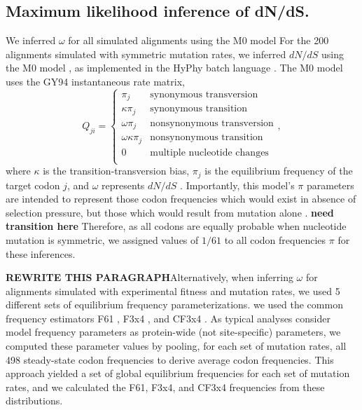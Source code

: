 \documentclass{pnastwo}
\begin{document}
\begin{article}
\subsection*{Maximum likelihood inference of dN/dS.}
We inferred $\omega$ for all simulated alignments using the M0 model 
For the 200 alignments simulated with symmetric mutation rates, we inferred $dN/dS$ using the M0 model \cite{Yangetal2000}, as implemented in the HyPhy batch language \cite{KosakovskyPondetal2005}. The M0 model uses the GY94 instantaneous rate matrix,
\begin{equation}\label{eq:GY94}
Q_{ji} = \left\{ 
	\begin{array}{rl}
	\pi_j                  &\mbox{synonymous transversion} \\
	\kappa \pi_j           &\mbox{synonymous transition} \\
 	\omega \pi_j           &\mbox{nonsynonymous transversion} \\
 	\omega \kappa \pi_j    &\mbox{nonsynonymous transition} \\
	0                      &\mbox{multiple nucleotide changes} \\             
	\end{array} \right.,
\end{equation}
where $\kappa$ is the transition-transversion bias, $\pi_j$ is the equilibrium frequency of the target codon $j$, and $\omega$ represents $dN/dS$ \cite{GoldmanYang1994,NielsenYang1998}. Importantly, this model's $\pi$ parameters are intended to represent those codon frequencies which would exist in absence of selection pressure, but those which would result from mutation alone \cite{GoldmanYang1994,MuseGaut1994,YN00,Yang2006}. 
\textbf{need transition here}
Therefore, as all codons are equally probable when nucleotide mutation is symmetric, we assigned values of $1/61$ to all codon frequencies $\pi$ for these inferences.

\textbf{REWRITE THIS PARAGRAPH}Alternatively, when inferring $\omega$ for alignments simulated with experimental fitness and mutation rates, we used 5 different sets of equilibrium frequency parameterizations. we used the common frequency estimators F61 \cite{GoldmanYang1994}, F3x4 \cite{MuseGaut1994}, and CF3x4 \cite{Pond2010}. As typical analyses consider model frequency parameters as protein-wide (not site-specific) parameters, we computed these parameter values by pooling, for each set of mutation rates, all 498 steady-state codon frequencies to derive average codon frequencies. This approach yielded a set of global equilibrium frequencies for each set of mutation rates, and we calculated the F61, F3x4, and CF3x4 frequencies from these distributions. 



\end{article}
\end{document}
